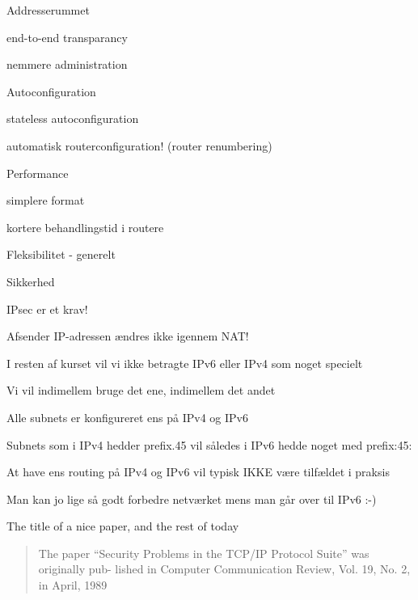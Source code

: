 \documentclass[Screen16to9,17pt]{foils}
\begin{document}

\begin{list1}
\item Addresserummet
\begin{list2}
\item end-to-end transparancy
\item 	nemmere administration
\end{list2}\item Autoconfiguration
\begin{list2}
\item stateless autoconfiguration
\item automatisk routerconfiguration!
(router renumbering)
\end{list2}
\item Performance
\begin{list2}
\item simplere format
\item kortere behandlingstid i routere
\end{list2}
\item Fleksibilitet - generelt
\item Sikkerhed
\begin{list2}
\item IPsec er et krav!
\item Afsender IP-adressen ændres ikke igennem NAT!
\end{list2}
\end{list1}


\begin{list1}
\item I resten af kurset vil vi ikke betragte IPv6 eller IPv4 som noget specielt
\item Vi vil indimellem bruge det ene, indimellem det andet
\item Alle subnets er konfigureret ens på IPv4 og IPv6
\item Subnets som i IPv4 hedder prefix.45 vil således i IPv6 hedde noget med prefix:45:
\item At have ens routing på IPv4 og IPv6 vil typisk IKKE være tilfældet i praksis
\item Man kan jo lige så godt forbedre netværket mens man går over til IPv6 :-)
\end{list1}


The title of a nice paper, and the rest of today
\begin{quote}
The paper “Security Problems in the TCP/IP Protocol Suite” was originally pub-
lished in Computer Communication Review, Vol. 19, No. 2, in April, 1989
\end{quote}
\end{document}
